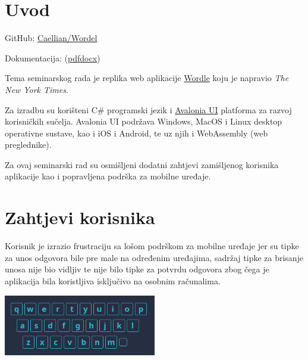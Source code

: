 \documentclass[12pt,a4paper]{report}
\begin{document}
\thispagestyle{empty}




\tableofcontents
\newpage

\setcounter{page}{1}

\chapter{Uvod}

{
    \raggedright

    GitHub:
    \href{https://github.com/Caellian/Wordel}{Caellian/Wordel}
    
    Dokumentacija:
    (\href{https://github.com/Caellian/Wordel/raw/main/tin_svagelj.pdf}{pdf}\textbar{}\href{https://github.com/Caellian/Wordel/raw/main/tin_svagelj.docx}{docx})    
}

Tema seminarskog rada je replika web aplikacije
\href{https://www.nytimes.com/games/wordle/index.html}{Wordle} koju je
napravio \emph{The New York Times}.

\par
Za izradbu su korišteni C\# programski jezik i
\href{https://avaloniaui.net/}{Avalonia UI} platforma za razvoj korisničkih
sučelja. Avalonia UI podržava Windows, MacOS i Linux desktop operativne sustave,
kao i iOS i Android, te uz njih i WebAssembly (web preglednike).

\par
Za ovaj seminarski rad su osmišljeni dodatni zahtjevi zamišljenog korisnika
aplikacije kao i popravljena podrška za mobilne uređaje.

\chapter{Zahtjevi korisnika}

Korisnik je izrazio frustraciju sa lošom podrškom za mobilne uređaje jer su
tipke za unos odgovora bile pre male na određenim uređajima, sadržaj tipke za
brisanje unosa nije bio vidljiv te nije bilo tipke za potvrdu odgovora zbog čega
je aplikacija bila koristljiva isključivo na osobnim računalima.

\smallskip
\begin{center}
    \includegraphics[height=100px,keepaspectratio]{./figures/prethodna_tipkovnica.png}
\end{center}
\smallskip
\end{document}
